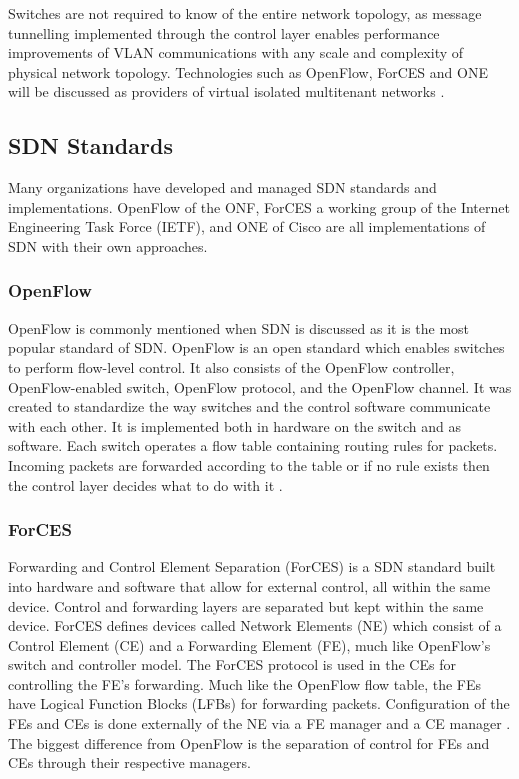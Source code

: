 \documentclass[12pt]{article}
\begin{document}
Switches are not required to know of the entire network topology, as message tunnelling implemented through the control layer enables performance improvements of VLAN communications with any scale and complexity of physical network topology. Technologies such as OpenFlow, ForCES and ONE will be discussed as providers of virtual isolated multitenant networks \cite{wang2015survey}.




\subsection{SDN Standards}

Many organizations have developed and managed SDN standards and implementations. OpenFlow of the ONF, ForCES a working group of the Internet Engineering Task Force (IETF), and ONE of Cisco are all implementations of SDN with their own approaches.

\subsubsection{OpenFlow}

OpenFlow \cite{openflow} is commonly mentioned when SDN is discussed as it is the most popular standard of SDN. OpenFlow is an open standard which enables switches to perform flow-level control. It also consists of the OpenFlow controller, OpenFlow-enabled switch, OpenFlow protocol, and the OpenFlow channel. It was created to standardize the way switches and the control software communicate with each other. It is implemented  both in hardware on the switch and as software. Each switch operates a flow table containing routing rules for packets. Incoming packets are forwarded according to the table or if no rule exists then the control layer decides what to do with it \cite{wang2015survey}.

\subsubsection{ForCES}

Forwarding and Control Element Separation (ForCES) \cite{forces} is a SDN standard built into hardware and software that allow for external control, all within the same device. Control and forwarding layers are separated but kept within the same device. ForCES defines devices called Network Elements (NE) which consist of a Control Element (CE) and a Forwarding Element (FE), much like OpenFlow's switch and controller model. The ForCES protocol is used in the CEs for controlling the FE's forwarding. Much like the OpenFlow flow table, the FEs have Logical Function Blocks (LFBs) for forwarding packets. Configuration of the FEs and CEs is done externally of the NE via a FE manager and a CE manager \cite{wang2015survey}. The biggest difference from OpenFlow is the separation of control for FEs and CEs through their respective managers.
\end{document}
